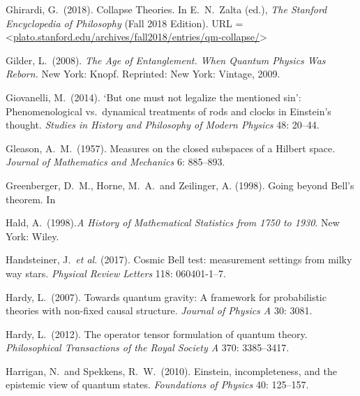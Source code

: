 \documentclass[12pt]{article}
\numberwithin{equation}{section}
\begin{document}
\begin{thebibliography}{}
 Ghirardi, G.\ (2018). Collapse Theories. In E.\ N.\ Zalta (ed.), \emph{The Stanford Encyclopedia of Philosophy} (Fall 2018 Edition). URL =
\textless\url{plato.stanford.edu/archives/fall2018/entries/qm-collapse/}\textgreater

 Gilder, L.\ (2008). \emph{The Age of Entanglement. When Quantum Physics Was Reborn.} New York: Knopf. Reprinted: New York: Vintage, 2009.

 Giovanelli, M.\ (2014). `But one must not legalize the mentioned sin': Phenomenological vs.\ dynamical treatments of rods and clocks in Einstein's thought. \emph{Studies in History and Philosophy of Modern Physics} 48: 20--44.

 Gleason, A.\ M.\ (1957). Measures on the closed subspaces of a Hilbert space. \emph{Journal of Mathematics and Mechanics} 6: 885--893.

 Greenberger, D.\ M., Horne, M.\ A.\ and Zeilinger, A. (1998). Going beyond Bell's theorem. In \citet[69--72]{Kafatos 1989}


 Hald, A.\ (1998).\emph{A History of Mathematical Statistics from 1750 to 1930}. New York: Wiley.

 Handsteiner, J.\ \emph{et al.} (2017). Cosmic Bell test: measurement settings from milky way stars. \emph{Physical Review Letters} 118: 060401-1--7.

 Hardy, L.\ (2007). Towards quantum gravity: A framework for probabilistic theories with non-fixed causal structure. \emph{Journal of Physics A} 30: 3081.

 Hardy, L.\ (2012). The operator tensor formulation of quantum theory. \emph{Philosophical Transactions of the Royal Society A} 370: 3385--3417.

 Harrigan, N.\ and Spekkens, R.\ W.\ (2010). Einstein, incompleteness, and the epistemic view of quantum states. \emph{Foundations of Physics} 40: 125--157.


\end{thebibliography}
\end{document}
